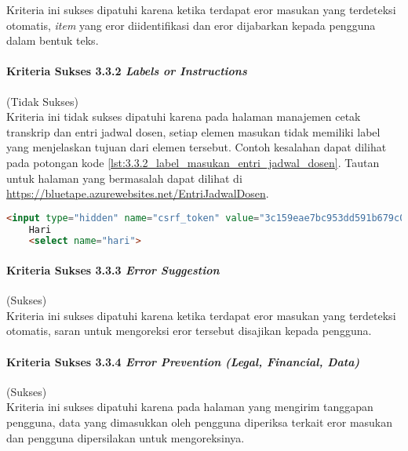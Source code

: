 Kriteria ini sukses dipatuhi karena ketika terdapat eror masukan yang terdeteksi otomatis, \textit{item} yang eror diidentifikasi dan eror dijabarkan kepada pengguna dalam bentuk teks.

\paragraph{Kriteria Sukses 3.3.2 \textit{Labels or Instructions}}
\label{par:kepatuhan_bluetape_kriteria_sukses_3.3.2}
(Tidak Sukses)\\

Kriteria ini tidak sukses dipatuhi karena pada halaman manajemen cetak transkrip dan entri jadwal dosen, setiap elemen masukan tidak memiliki label yang menjelaskan tujuan dari elemen tersebut. Contoh kesalahan dapat dilihat pada potongan kode \ref{lst:3.3.2_label_masukan_entri_jadwal_dosen}. Tautan untuk halaman yang bermasalah dapat dilihat di \url{https://bluetape.azurewebsites.net/EntriJadwalDosen}.

\begin{lstlisting}[frame=single, label={lst:3.3.2_label_masukan_entri_jadwal_dosen}, language=HTML, caption=Kriteria Sukses 3.3.2 - Tidak Terdapat Label pada Kolom Masukan di Halaman Entri Jadwal Dosen]
    <input type="hidden" name="csrf_token" value="3c159eae7bc953dd591b679c080ed066"/>
    Hari
    <select name="hari">
\end{lstlisting}

\paragraph{Kriteria Sukses 3.3.3 \textit{Error Suggestion}}
\label{par:kepatuhan_bluetape_kriteria_sukses_3.3.3}
(Sukses)\\

Kriteria ini sukses dipatuhi karena ketika terdapat eror masukan yang terdeteksi otomatis, saran untuk mengoreksi eror tersebut disajikan kepada pengguna.

\paragraph{Kriteria Sukses 3.3.4 \textit{Error Prevention (Legal, Financial, Data)\\}}
\label{par:kepatuhan_bluetape_kriteria_sukses_3.3.4}
(Sukses)\\

Kriteria ini sukses dipatuhi karena pada halaman yang mengirim tanggapan pengguna, data yang dimasukkan oleh pengguna diperiksa terkait eror masukan dan pengguna dipersilakan untuk mengoreksinya.

